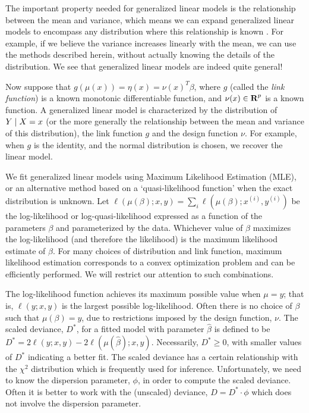 \documentclass[12pt]{article}
\begin{document}
The important property needed for generalized linear models is the relationship between the mean and variance, which means we can expand generalized linear models to encompass any distribution where this relationship is known \cite[\S 9]{MN:1983}. For example, if we believe the variance increases linearly with the mean, we can use the methods described herein, without actually knowing the details of the distribution. We see that generalized linear models are indeed quite general!

Now suppose that $g(\mu(x)) = \eta(x) = \nu(x)^T \beta$, where $g$ (called the \emph{link function}) is a known monotonic differentiable function, and $\nu(x) \in {\mbox{\bf R}}^p$ is a known function. A generalized linear model is characterized by the distribution of $Y \; | \; X = x$ (or the more generally the relationship between the mean and variance of this distribution), the link function $g$ and the design function $\nu$. For example, when $g$ is the identity, and the normal distribution is chosen, we recover the linear model.

We fit generalized linear models using Maximum Likelihood Estimation (MLE), or an alternative method based on a `quasi-likelihood function' when the exact distribution is unknown. Let $\ell(\mu(\beta); x, y) = \sum_i \ell(\mu(\beta); x^{(i)}, y^{(i)})$ be the log-likelihood or log-quasi-likelihood expressed as a function of the parameters $\beta$ and parameterized by the data. Whichever value of $\beta$ maximizes the log-likelihood (and therefore the likelihood) is the maximum likelihood estimate of $\beta$. For many choices of distribution and link function, maximum likelihood estimation corresponds to a convex optimization problem and can be efficiently performed. We will restrict our attention to such combinations.

The log-likelihood function achieves its maximum possible value when $\mu = y$; that is, $\ell(y; x, y)$ is the largest possible log-likelihood. Often there is no choice of $\beta$ such that $\mu(\beta) = y$, due to restrictions imposed by the design function, $\nu$. The scaled deviance, $D^*$, for a fitted model with parameter $\hat{\beta}$ is defined to be $D^* = 2 \ell(y; x, y) - 2 \ell(\mu(\hat{\beta}); x, y)$. Necessarily, $D^* \geq 0$, with smaller values of $D^*$ indicating a better fit. The scaled deviance has a certain relationship with the $\chi^2$ distribution which is frequently used for inference. Unfortunately, we need to know the dispersion parameter, $\phi$, in order to compute the scaled deviance. Often it is better to work with the (unscaled) deviance, $D = D^* \cdot \phi$ which does not involve the dispersion parameter.
\end{document}
